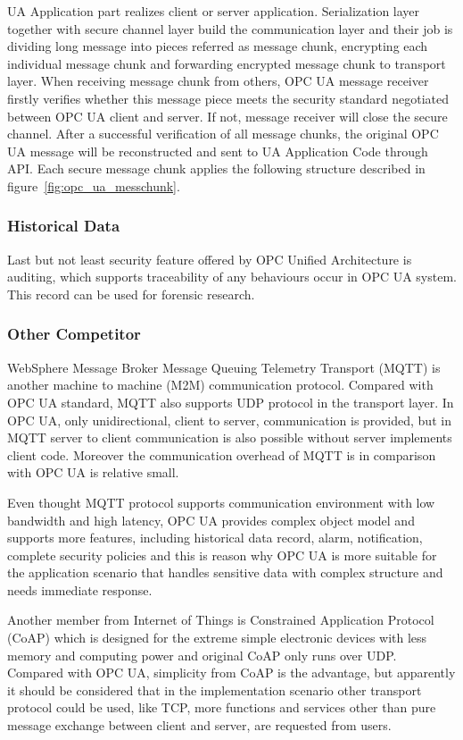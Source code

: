 \documentclass[]{llncs}
\begin{document}
UA Application part realizes client or server application. Serialization layer together with secure channel layer build the communication layer and their job is dividing long message into pieces referred as message chunk, encrypting each individual message chunk and forwarding encrypted message chunk to transport layer. When receiving message chunk from others, OPC UA message receiver firstly verifies whether this message piece meets the security standard negotiated between OPC UA client and server. If not, message receiver will close the secure channel. After a successful verification of all message chunks, the original OPC UA message will be reconstructed and sent to UA Application Code through API. Each secure message chunk applies the following structure described in figure~\ref{fig:opc_ua_messchunk}.


\subsubsection{Historical Data}
Last but not least security feature offered by OPC Unified Architecture is auditing, which supports traceability of any behaviours occur in OPC UA system. This record can be used for forensic research.


\subsubsection{Other Competitor}
WebSphere Message Broker Message Queuing Telemetry Transport (MQTT)\cite{Ref3} is another machine to machine (M2M) communication protocol. Compared with OPC UA standard, MQTT also supports UDP protocol in the transport layer. In OPC UA, only unidirectional, client to server, communication is provided, but in MQTT server to client communication is also possible without server implements client code. Moreover the communication overhead of MQTT is in comparison with OPC UA is relative small. 


Even thought MQTT protocol supports communication environment with low bandwidth and high latency, OPC UA provides complex object model and supports more features, including historical data record, alarm, notification, complete security policies and this is reason why OPC UA is more suitable for the application scenario that handles sensitive data with complex structure and needs immediate response.


Another member from Internet of Things is Constrained Application Protocol (CoAP)\cite{Ref5} which is designed for the extreme simple electronic devices with less memory and computing power and original CoAP only runs over UDP. Compared with OPC UA, simplicity from CoAP is the advantage, but apparently it should be considered that in the implementation scenario other transport protocol could be used, like TCP, more functions and services other than pure message exchange between client and server, are requested from users.
\end{document}
